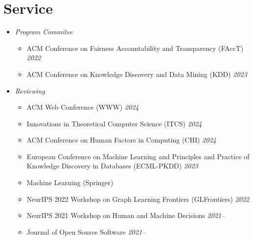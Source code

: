 \documentclass[margin]{res}
\begin{document}
\begin{resume}
\begin{itemize}[nosep]
\end{itemize}

\section{Service} 
%
%

\begin{itemize}[nosep]
	\item \emph{Program Commitee}
	\begin{itemize}[nosep]
		\item ACM Conference on Fairness Accountability and Transparency (FAccT) \hfill \emph{2022}
		\item ACM Conference on Knowledge Discovery and Data Mining (KDD) \hfill \emph{2023}
	\end{itemize}
	\item \emph{Reviewing}
	\begin{itemize}[nosep]
		\item ACM Web Conference (WWW) \hfill \emph{2024}
		\item Innovations in Theoretical Computer Science (ITCS) \hfill \emph{2024}
		\item ACM Conference on Human Factors in Computing (CHI) \hfill \emph{2024}
		\item European Conference on Machine Learning and Principles and Practice of Knowledge Discovery in Databases (ECML-PKDD) \hfill \emph{2023}
		\item Machine Learning (Springer)
		\item NeurIPS 2022 Workshop on Graph Learning Frontiers (GLFrontiers) \hfill \emph{2022}
		\item NeurIPS 2021 Workshop on Human and Machine Decisions \hfill \emph{2021--} 
		\item Journal of Open Source Software \hfill \emph{2021--}
	\end{itemize}
	

\end{itemize}
\end{resume}
\end{document}
